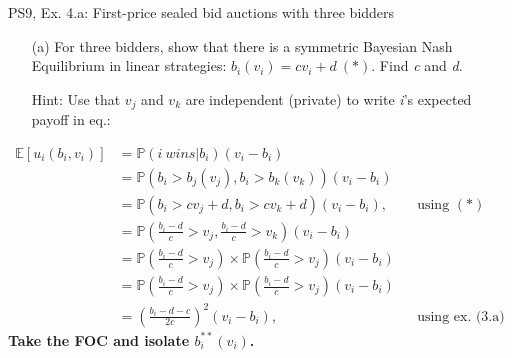 \begin{frame}{PS9, Ex. 4.a: First-price sealed bid auctions with three bidders}
    \begin{itemize}
      \item[(a)] For three bidders, show that there is a symmetric Bayesian Nash Equilibrium in linear strategies: $b_i(v_i) = cv_i + d\ (*)$. Find \textit{c} and \textit{d}.
      \item[Hint:] Use that $v_j$ and $v_k$ are independent (private) to write \textit{i}'s expected payoff in eq.:
    \end{itemize}
    \vspace{-10pt}
    \begin{align*}
      \mathbb{E}[u_i(b_i,v_i)]
      &=\mathbb{P}(i\ wins|b_i)(v_i-b_i)\\
      &=\mathbb{P}\left(b_i>b_j(v_j),b_i>b_k(v_k)\right)(v_i-b_i)\\
      &=\mathbb{P}(b_i>cv_j+d,b_i>cv_k+d)(v_i-b_i),&&\text{using }(*)\\
      &=\mathbb{P}\left(\frac{b_i-d}{c}>v_j,\frac{b_i-d}{c}>v_k\right)(v_i-b_i)\\
      &=\mathbb{P}\left(\frac{b_i-d}{c}>v_j\right)\times\mathbb{P}\left(\frac{b_i-d}{c}>v_j\right)(v_i-b_i)\\
      &=\mathbb{P}\left(\frac{b_i-d}{c}>v_j\right)\times\mathbb{P}\left(\frac{b_i-d}{c}>v_j\right)(v_i-b_i)\\
      &=\left(\frac{b_i-d-c}{2c}\right)^2(v_i-b_i),&&\text{using ex. (3.a)}
    \end{align*}
    \vspace{-8pt}
    \textbf{Take the FOC and isolate $b_i^{**}(v_i)$.}
    \vfill\null
\end{frame}
